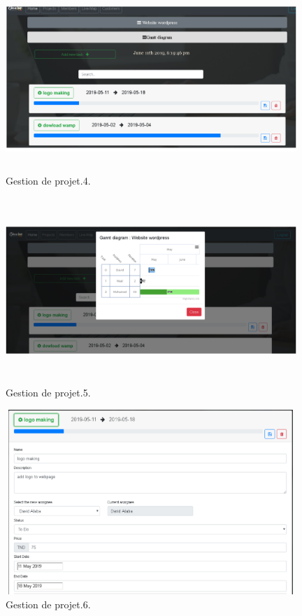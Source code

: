 \FloatBarrier
\begin{figure}[H]
\center
\includegraphics[width=11cm,height=7cm]{./figures/pres/gp4.png}
\caption{Gestion de projet.4.}
\end{figure}
\FloatBarrier



\FloatBarrier
\begin{figure}[H]
\center
\includegraphics[width=11cm,height=7cm]{./figures/pres/gp5.png}
\caption{Gestion de projet.5.}
\end{figure}
\FloatBarrier


\FloatBarrier
\begin{figure}[H]
\center
\includegraphics[width=11cm,height=7cm]{./figures/pres/gp6.png}
\caption{Gestion de projet.6.}
\end{figure}
\FloatBarrier

